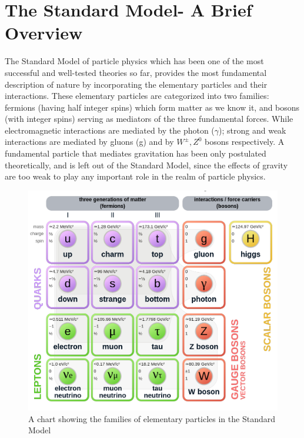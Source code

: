 \section{The Standard Model- A Brief Overview}
The Standard Model of particle physics which has been one of the most successful and well-tested theories so far, provides the most fundamental description of nature by incorporating the elementary particles and their interactions. These elementary particles are categorized into two families: fermions (having half integer spins) which form matter as we know it, and bosons (with integer spins) serving as mediators of the three fundamental forces. While electromagnetic interactions are mediated by the photon ($\gamma$); strong and weak interactions are mediated by gluons (g) and by $W^{\pm}, Z^{0}$ bosons respectively. A fundamental particle that mediates gravitation has been only postulated theoretically, and is left out of the Standard Model, since the effects of gravity are too weak to play any important role in the realm of particle physics. 

\begin{figure}[h!]
\centering
\includegraphics[scale=0.4]{./images/Standard_Model_of_Elementary_Particles.png}
\caption{A chart showing the families of elementary particles in the Standard Model}
\label{fig:StdModel}
\end{figure}

